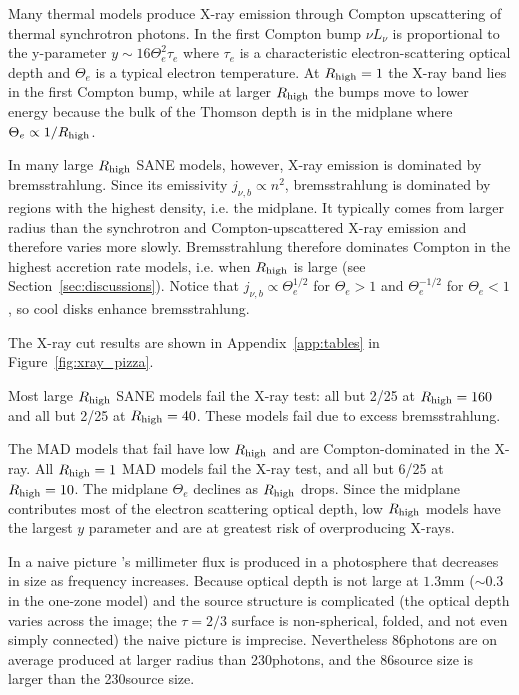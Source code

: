 Many thermal models produce X-ray emission through Compton upscattering of thermal synchrotron photons.  In the first Compton bump $\nu L_\nu$ is proportional to the y-parameter $y \sim 16 \Theta_e^2 \tau_e$ where $\tau_e$ is a characteristic electron-scattering optical depth and $\Theta_e$ is a typical electron temperature.  At $R_\mathrm{high} = 1$ the X-ray band lies in the first Compton bump, while at larger $R_\mathrm{high}$ the bumps move to lower energy because the bulk of the Thomson depth is in the midplane where $\Theta_e \propto 1/R_\mathrm{high}$.

In many large $R_\mathrm{high}$ SANE models, however, X-ray emission is dominated by bremsstrahlung.  Since its emissivity $j_{\nu,b} \propto n^2$, bremsstrahlung is dominated by regions with the highest density, i.e. the midplane.  It typically comes from larger radius than the synchrotron and Compton-upscattered X-ray emission and therefore varies more slowly.  Bremsstrahlung therefore dominates Compton in the highest accretion rate models, i.e. when $R_\mathrm{high}$ is large (see Section~\ref{sec:discussions}).  Notice that $j_{\nu,b} \propto \Theta_e^{1/2}$ for $\Theta_e > 1$ and $\Theta_e^{-1/2}$ for $\Theta_e < 1$, so cool disks enhance bremsstrahlung.

The X-ray cut results are shown in Appendix~\ref{app:tables} in Figure~\ref{fig:xray_pizza}.

Most large $R_\mathrm{high}$ SANE models fail the X-ray test: all but 2/25 at $R_\mathrm{high} = 160$ and all but 2/25 at $R_\mathrm{high} = 40$.  These models fail due to excess bremsstrahlung.

The MAD models that fail have low $R_\mathrm{high}$ and are Compton-dominated in the X-ray.  All $R_\mathrm{high} = 1$ MAD models fail the X-ray test, and all but 6/25 at $R_\mathrm{high} = 10$.  The midplane $\Theta_e$ declines as $R_\mathrm{high}$ drops.  Since the midplane contributes most of the electron scattering optical depth, low $R_\mathrm{high}$ models have the largest $y$ parameter and are at greatest risk of overproducing X-rays.



In a naive picture \sgra's millimeter flux is produced in a photosphere that decreases in size as frequency increases.  Because optical depth is not large at $1.3$mm ($\sim 0.3$ in the one-zone model) and the source structure is complicated (the optical depth varies across the image; the $\tau = 2/3$ surface is non-spherical, folded, and not even simply connected) the naive picture is imprecise.  Nevertheless 86\GHz photons are on average produced at larger radius than 230\GHz photons, and the 86\GHz source size is larger than the 230\GHz source size.

